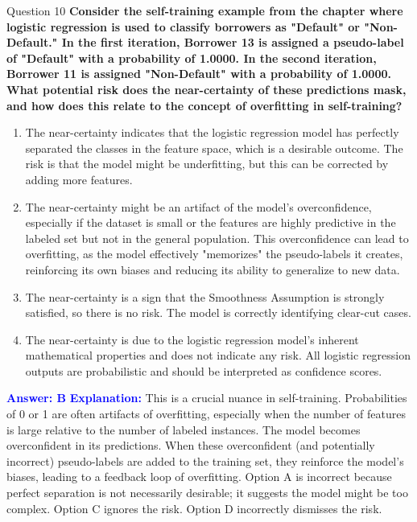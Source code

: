 \documentclass[8pt]{beamer}  %
\begin{document}
	\begin{frame}{Question 10}
		\textbf{Consider the self-training example from the chapter where logistic regression is used to classify borrowers as "Default" or "Non-Default." In the first iteration, Borrower 13 is assigned a pseudo-label of "Default" with a probability of 1.0000. In the second iteration, Borrower 11 is assigned "Non-Default" with a probability of 1.0000. What potential risk does the near-certainty of these predictions mask, and how does this relate to the concept of overfitting in self-training?}
		\begin{enumerate}
			\item The near-certainty indicates that the logistic regression model has perfectly separated the classes in the feature space, which is a desirable outcome. The risk is that the model might be underfitting, but this can be corrected by adding more features.
			\item The near-certainty might be an artifact of the model's overconfidence, especially if the dataset is small or the features are highly predictive in the labeled set but not in the general population. This overconfidence can lead to overfitting, as the model effectively "memorizes" the pseudo-labels it creates, reinforcing its own biases and reducing its ability to generalize to new data.
			\item The near-certainty is a sign that the Smoothness Assumption is strongly satisfied, so there is no risk. The model is correctly identifying clear-cut cases.
			\item The near-certainty is due to the logistic regression model's inherent mathematical properties and does not indicate any risk. All logistic regression outputs are probabilistic and should be interpreted as confidence scores.
		\end{enumerate}
		\vspace{0.2cm}
		\textcolor{blue}{\textbf{Answer: B}}
		\vspace{0.2cm}
		\textcolor{blue}{\textbf{Explanation:}} This is a crucial nuance in self-training. Probabilities of 0 or 1 are often artifacts of overfitting, especially when the number of features is large relative to the number of labeled instances. The model becomes overconfident in its predictions. When these overconfident (and potentially incorrect) pseudo-labels are added to the training set, they reinforce the model's biases, leading to a feedback loop of overfitting. Option A is incorrect because perfect separation is not necessarily desirable; it suggests the model might be too complex. Option C ignores the risk. Option D incorrectly dismisses the risk.
	\end{frame}
	
\end{document}
